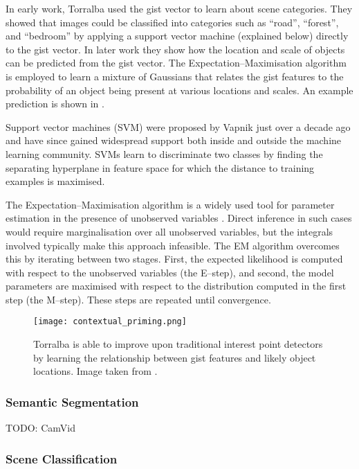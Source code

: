 In early work, Torralba \etal used the gist vector to learn about
scene categories. They showed that images could be classified into
categories such as ``road'', ``forest'', and ``bedroom'' by applying a
support vector machine (explained below) directly to the gist
vector. In later work \cite{Torralba03} they show how the location and
scale of objects can be predicted from the gist vector. The
Expectation--Maximisation algorithm \cite{Dempster77} is employed
to learn a mixture of Gaussians that relates the gist features to the
probability of an object being present at various locations and
scales. An example prediction is shown in .

Support vector machines (SVM) were proposed by Vapnik \cite{Vapnik95}
just over a decade ago and have since gained widespread support both
inside and outside the machine learning community. SVMs learn to
discriminate two classes by finding the separating hyperplane in
feature space for which the distance to training examples is
maximised.

The Expectation--Maximisation algorithm is a widely used tool for
parameter estimation in the presence of unobserved variables
\cite{Dempster77}. Direct inference in such cases would require
marginalisation over all unobserved variables, but the integrals
involved typically make this approach infeasible. The EM algorithm
overcomes this by iterating between two stages. First, the expected
likelihood is computed with respect to the unobserved variables (the
E--step), and second, the model parameters are maximised with respect
to the distribution computed in the first step (the M--step). These
steps are repeated until convergence.

\begin{figure}[tb]
\centering
\texttt{[image: contextual\_priming.png]}
\caption{Torralba \etal \cite{Torralba03} is able to improve upon
  traditional interest point detectors by learning the relationship
  between gist features and likely object locations. Image taken from
  \cite{Torralba03}.}
\label{fig:contextual-priming}
\end{figure}

\subsubsection{Semantic Segmentation}

TODO: CamVid



\subsubsection{Scene Classification}

